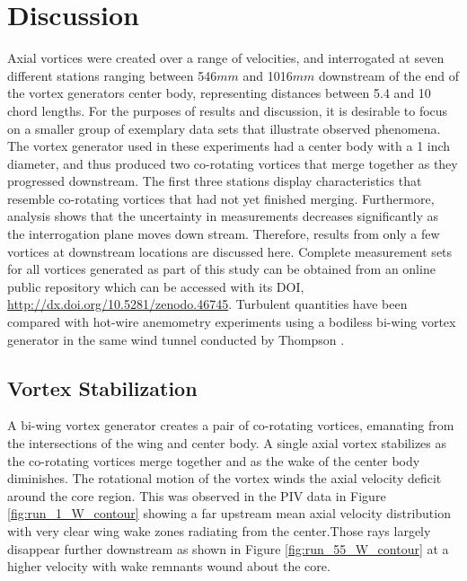 
\section{Discussion}

Axial vortices were created over a range of velocities, and interrogated at 
seven different stations ranging between 546$mm$ and 1016$mm$ downstream of the 
end of the vortex generators center body, representing distances between 5.4 
and 10 chord lengths. For the 
purposes of results and discussion, it is desirable to focus on a smaller group 
of exemplary data sets that illustrate observed phenomena. The vortex generator 
used in these experiments had a center body with a 1 inch diameter, and thus 
produced two co-rotating vortices that merge together as they progressed 
downstream. 
The first three stations display characteristics that resemble co-rotating 
vortices that had not yet finished merging. Furthermore, analysis shows that 
the uncertainty in measurements decreases significantly as the interrogation 
plane moves down stream. Therefore, results from only a few vortices at 
downstream locations are discussed here. Complete measurement sets for all 
vortices generated as part of this study can be obtained from an online public 
repository which can be accessed with its DOI,  
\url{http://dx.doi.org/10.5281/zenodo.46745}. Turbulent quantities have 
been compared with hot-wire anemometry experiments using a bodiless bi-wing 
vortex generator in the same wind tunnel conducted by Thompson 
\cite{thompson2016}.


\subsection{Vortex Stabilization}
A bi-wing vortex generator creates a pair of co-rotating vortices, emanating 
from the intersections of the wing and center body. A single 
axial vortex stabilizes as the co-rotating vortices merge together and as the 
wake of the center body diminishes. The rotational motion of the vortex 
winds the axial velocity deficit around the core region. This was observed 
in the PIV data in Figure \ref{fig:run_1_W_contour} showing a far upstream 
mean axial velocity distribution with very clear wing wake zones radiating from 
the center.Those rays largely disappear further downstream as shown in Figure 
\ref{fig:run_55_W_contour} at a higher velocity with wake remnants wound about 
the core. 




